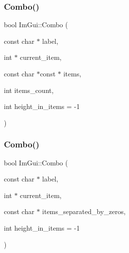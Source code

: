 \mbox{\label{namespace_im_gui_ae801624ec02dac3b2b03321fffd91f1a}} 
\subsubsection{\texorpdfstring{Combo()}{Combo()}\hspace{0.1cm}{\footnotesize\ttfamily [1/3]}}
{\footnotesize\ttfamily bool Im\+Gui\+::\+Combo (\begin{DoxyParamCaption}\item[{const char $\ast$}]{label,  }\item[{int $\ast$}]{current\+\_\+item,  }\item[{const char $\ast$const $\ast$}]{items,  }\item[{int}]{items\+\_\+count,  }\item[{int}]{height\+\_\+in\+\_\+items = {\ttfamily -\/1} }\end{DoxyParamCaption})}

\mbox{\label{namespace_im_gui_ae80520312b19a7039b77d2bafcbda8e5}} 
\subsubsection{\texorpdfstring{Combo()}{Combo()}\hspace{0.1cm}{\footnotesize\ttfamily [2/3]}}
{\footnotesize\ttfamily bool Im\+Gui\+::\+Combo (\begin{DoxyParamCaption}\item[{const char $\ast$}]{label,  }\item[{int $\ast$}]{current\+\_\+item,  }\item[{const char $\ast$}]{items\+\_\+separated\+\_\+by\+\_\+zeros,  }\item[{int}]{height\+\_\+in\+\_\+items = {\ttfamily -\/1} }\end{DoxyParamCaption})}

\mbox{\label{namespace_im_gui_a65d00f64f98ccb810bdb75721612948c}} 
